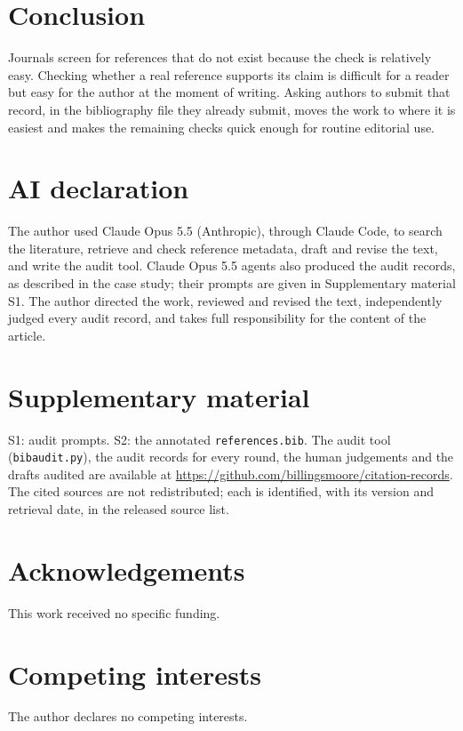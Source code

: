 \documentclass[11pt]{article}
\begin{document}
\section{Conclusion}

Journals screen for references that do not exist because the check is relatively easy. Checking whether a real reference supports its claim is difficult for a reader but easy for the author at the moment of writing. Asking authors to submit that record, in the bibliography file they already submit, moves the work to where it is easiest and makes the remaining checks quick enough for routine editorial use.

\section*{AI declaration}

The author used Claude Opus 5.5 (Anthropic), through Claude Code, to search the literature, retrieve and check reference metadata, draft and revise the text, and write the audit tool. Claude Opus 5.5 agents also produced the audit records, as described in the case study; their prompts are given in Supplementary material S1. The author directed the work, reviewed and revised the text, independently judged every audit record, and takes full responsibility for the content of the article.

\section*{Supplementary material}

S1: audit prompts. S2: the annotated \texttt{references.bib}. The audit tool (\texttt{bibaudit.py}), the audit records for every round, the human judgements and the drafts audited are available at \url{https://github.com/billingsmoore/citation-records}. The cited sources are not redistributed; each is identified, with its version and retrieval date, in the released source list.

\section*{Acknowledgements}

This work received no specific funding.

\section*{Competing interests}

The author declares no competing interests.



\end{document}
